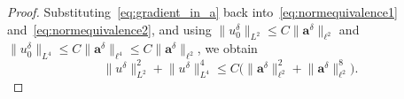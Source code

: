 \documentclass[a4paper,reqno,twoside]{amsart}
\numberwithin{equation}{section}
\theoremstyle{definition}
\newcommand{\<}{\ensuremath \leq}
\renewcommand{\>}{\ensuremath \geq}
\begin{document}
\begin{proof}
    Substituting~\eqref{eq:gradient_in_a} back
    into~\eqref{eq:normequivalence1}
    and~\eqref{eq:normequivalence2}, and using
    $\lVert u_0^\delta \rVert_{L^2} \leq C
    \lVert \mathbf{a}^\delta \rVert_{\ell^2}$
    and
    $\lVert u_0^\delta \rVert_{L^4} \leq C
    \lVert \mathbf{a}^\delta \rVert_{\ell^4}
    \leq C \lVert \mathbf{a}^\delta \rVert_{\ell^2}$,
    we obtain
    \begin{equation}
        \lVert u^\delta \rVert_{L^2}^2
        + \lVert u^\delta \rVert_{L^4}^4
        \leq C \bigl(
          \lVert \mathbf{a}^\delta \rVert_{\ell^2}^2
          + \lVert \mathbf{a}^\delta \rVert_{\ell^2}^8
        \bigr).
    \end{equation}
\end{proof}


\end{document}
